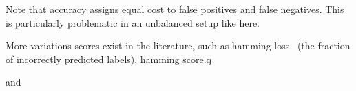 Note that accuracy assigns equal cost to false positives and false negatives. This is particularly problematic in an unbalanced setup like here.



More variations scores exist in the literature, such as hamming loss~\cite{hammingLoss} (the fraction of incorrectly predicted labels), hamming score.q


 \cite{lossComp}

 \cite{MLTSVM} and \cite{MLTSVMThreeway}


